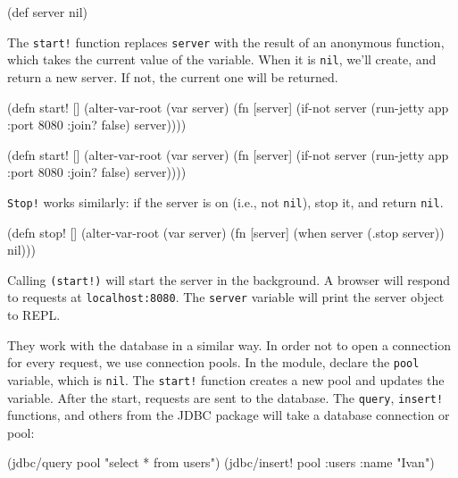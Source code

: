 \begin{clojure}
(def server nil)
\end{clojure}

The \verb|start!| function replaces \verb|server| with the result of an anonymous function, which takes the current value of the variable.
When it is \verb|nil|, we'll create, and return a new server. If not, the current one will be returned.

\ifx\DEVICETYPE\MOBILE

\begin{clojure}
(defn start! []
  (alter-var-root
   (var server)
   (fn [server]
     (if-not server
       (run-jetty app {:port 8080
                       :join? false})
       server))))
\end{clojure}

\else

\begin{clojure}
(defn start! []
  (alter-var-root
   (var server)
   (fn [server]
     (if-not server
       (run-jetty app {:port 8080 :join? false})
       server))))
\end{clojure}

\fi

\noindent
\verb|Stop!| works similarly: if the server is on (i.e., not \verb|nil|), stop it, and return \verb|nil|.

\begin{clojure}
(defn stop! []
  (alter-var-root
   (var server)
   (fn [server]
     (when server
       (.stop server))
     nil)))
\end{clojure}

\mnoindent
Calling \verb|(start!)| will start the server in the background. A browser will respond to requests at \texttt{localhost\-:8080}.
The \verb|server| variable will print the server object to REPL.


They work with the database in a similar way.
In order not to open a connection for every request, we use connection pools.
In the module, declare the \verb|pool| variable, which is \verb|nil|.
The \verb|start!| function creates a new pool and updates the variable. After the start, requests are sent to the database. The \verb|query|, \verb|insert!| functions, and others from the JDBC package will take a database connection or pool:

\ifx\DEVICETYPE\MOBILE

\begin{clojure}
(jdbc/query pool "select * from users")
(jdbc/insert! pool
  :users {:name "Ivan"})
\end{clojure}

